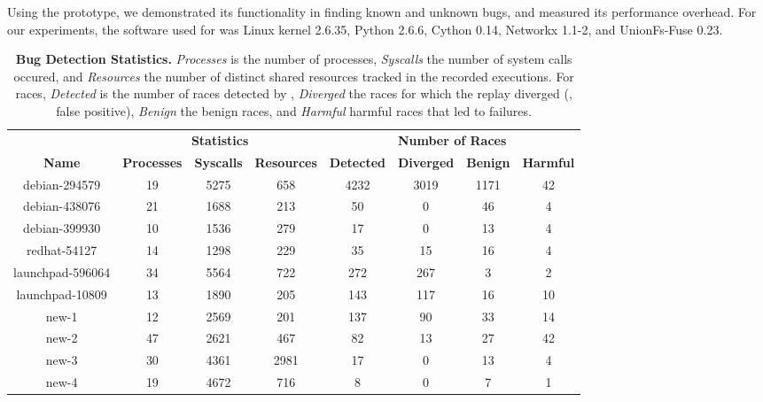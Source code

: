 Using the \racepro prototype, we demonstrated its functionality in finding
known and unknown bugs, and measured its performance overhead.  For
our experiments, the software used for \racepro was Linux kernel 2.6.35,
Python 2.6.6, Cython 0.14, Networkx 1.1-2, and UnionFs-Fuse 0.23.


\begin{table}[t]
  \small
\centering

\begin{tabular}{c|ccc|cccc}
  \toprule
{\bf } & \multicolumn{3}{|c}{\bf Statistics} & \multicolumn{4}{|c}{\bf Number of Races} \\
  {\bf Name} & {\bf Processes} & {\bf Syscalls} & {\bf Resources} & {\bf Detected} & {\bf Diverged} & {\bf Benign} & {\bf Harmful} \\
\midrule
debian-294579    &  19  &  5275  &  658   &  4232  &  3019  &  1171 &  42  \\
debian-438076    &  21  &  1688  &  213   &  50    &  0     &  46   &  4   \\
debian-399930    &  10  &  1536  &  279   &  17    &  0     &  13   &  4   \\
redhat-54127     &  14  &  1298  &  229   &  35    &  15    &  16   &  4   \\
launchpad-596064 &  34  &  5564  &  722   &  272   &  267   &  3    &  2   \\
launchpad-10809  &  13  &  1890  &  205   &  143   &  117   &  16   &  10  \\
new-1            &  12  &  2569  &  201   &  137   &  90    &  33   &  14  \\
new-2            &  47  &  2621  &  467   &  82    &  13    &  27   &  42  \\
new-3            &  30  &  4361  &  2981  &  17    &  0     &  13   &  4   \\
new-4            &  19  &  4672  &  716   &  8     &  0     &  7    &  1   \\
\bottomrule
\end{tabular}

\caption{{\bf Bug Detection Statistics.}  {\em Processes} is the
  number of processes, {\em Syscalls} the number of system calls
  occured, and {\em Resources} the number of distinct shared resources
  tracked in the recorded executions. For races, {\em Detected} is the
  number of races detected by \racepro, {\em Diverged} the races for which
  the replay diverged (\ie, false positive), {\em Benign} the benign
  races, and {\em Harmful} harmful races that led to failures.} \label{racepro:tab:bug-stat}

\end{table}


